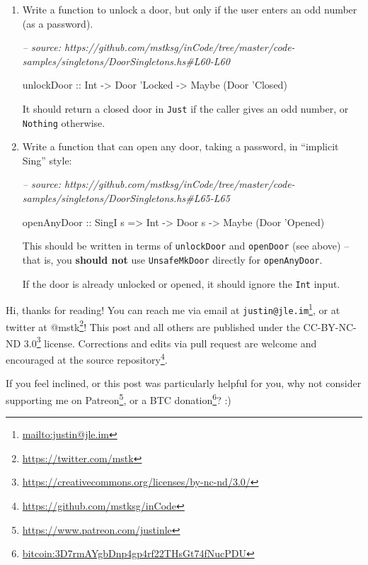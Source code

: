 \documentclass[]{article}
\newenvironment{Shaded}{}{}
\newcommand{\CommentTok}[1]{\textcolor[rgb]{0.38,0.63,0.69}{\textit{#1}}}
\newcommand{\DataTypeTok}[1]{\textcolor[rgb]{0.56,0.13,0.00}{#1}}
\newcommand{\NormalTok}[1]{#1}
\newcommand{\OtherTok}[1]{\textcolor[rgb]{0.00,0.44,0.13}{#1}}
\renewcommand{\href}[2]{#2\footnote{\url{#1}}}
\begin{document}
\begin{enumerate}
\def\labelenumi{\arabic{enumi}.}
\item
  Write a function to unlock a door, but only if the user enters an odd number
  (as a password).

\begin{Shaded}
\begin{Highlighting}[]
\CommentTok{-- source: https://github.com/mstksg/inCode/tree/master/code-samples/singletons/DoorSingletons.hs#L60-L60}

\OtherTok{unlockDoor ::} \DataTypeTok{Int} \OtherTok{->} \DataTypeTok{Door}\NormalTok{ '}\DataTypeTok{Locked} \OtherTok{->} \DataTypeTok{Maybe}\NormalTok{ (}\DataTypeTok{Door}\NormalTok{ '}\DataTypeTok{Closed}\NormalTok{)}
\end{Highlighting}
\end{Shaded}

  It should return a closed door in \texttt{Just} if the caller gives an odd
  number, or \texttt{Nothing} otherwise.
\item
  Write a function that can open any door, taking a password, in ``implicit
  Sing'' style:

\begin{Shaded}
\begin{Highlighting}[]
\CommentTok{-- source: https://github.com/mstksg/inCode/tree/master/code-samples/singletons/DoorSingletons.hs#L65-L65}

\OtherTok{openAnyDoor ::} \DataTypeTok{SingI}\NormalTok{ s }\OtherTok{=>} \DataTypeTok{Int} \OtherTok{->} \DataTypeTok{Door}\NormalTok{ s }\OtherTok{->} \DataTypeTok{Maybe}\NormalTok{ (}\DataTypeTok{Door}\NormalTok{ '}\DataTypeTok{Opened}\NormalTok{)}
\end{Highlighting}
\end{Shaded}

  This should be written in terms of \texttt{unlockDoor} and \texttt{openDoor}
  (see above) -- that is, you \textbf{should not} use \texttt{UnsafeMkDoor}
  directly for \texttt{openAnyDoor}.

  If the door is already unlocked or opened, it should ignore the \texttt{Int}
  input.
\end{enumerate}

Hi, thanks for reading! You can reach me via email at
\href{mailto:justin@jle.im}{\nolinkurl{justin@jle.im}}, or at twitter at
\href{https://twitter.com/mstk}{@mstk}! This post and all others are published
under the \href{https://creativecommons.org/licenses/by-nc-nd/3.0/}{CC-BY-NC-ND
3.0} license. Corrections and edits via pull request are welcome and encouraged
at \href{https://github.com/mstksg/inCode}{the source repository}.

If you feel inclined, or this post was particularly helpful for you, why not
consider \href{https://www.patreon.com/justinle}{supporting me on Patreon}, or a
\href{bitcoin:3D7rmAYgbDnp4gp4rf22THsGt74fNucPDU}{BTC donation}? :)
\end{document}
